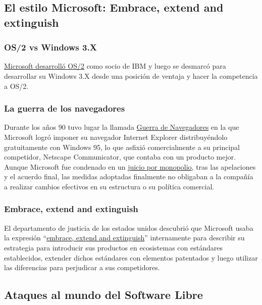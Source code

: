 \documentclass[10pt, titlepage]{article}
\begin{document}
\subsection{El estilo Microsoft: Embrace, extend and extinguish}

\subsubsection{OS/2 vs Windows 3.X}
\href{https://www.quora.com/Why-did-IBMs-OS-2-project-lose-to-Microsoft-given-that-IBM-had-much-more-resources-than-Microsoft-at-that-time}{Microsoft desarrolló OS/2} como socio de IBM y luego se desmarcó para desarrollar su Windows 3.X desde una posición de ventaja y hacer la competencia a OS/2.

\subsubsection{La guerra de los navegadores}
Durante los años 90 tuvo lugar la llamada \href{https://es.wikipedia.org/wiki/Guerra_de_navegadores}{Guerra de Navegadores} en la que Microsoft logró imponer su navegador Internet Explorer distribuyéndolo gratuitamente con Windows 95, lo que asfixió comercialmente a su principal competidor, Netscape Communicator, que contaba con un producto mejor. Aunque Microsoft fue condenado en un \href{https://es.wikipedia.org/wiki/Caso_Estados_Unidos_contra_Microsoft}{juicio por monopolio}, tras las apelaciones y el acuerdo final, las medidas adoptadas finalmente no obligaban a la compañía a realizar cambios efectivos en su estructura o su política comercial.

\subsubsection{Embrace, extend and extinguish}
El departamento de justicia de los estados unidos descubrió que Microsoft usaba la expresión ``\href{https://en.wikipedia.org/wiki/Embrace,_extend,_and_extinguish}{embrace, extend and extinguish}'' internamente para describir su estrategia para introducir sus productos en ecosistemas con estándares establecidos, extender dichos estándares con elementos patentados y luego utilizar las diferencias para perjudicar a sus competidores.

\subsection{Ataques al mundo del Software Libre}
\end{document}
